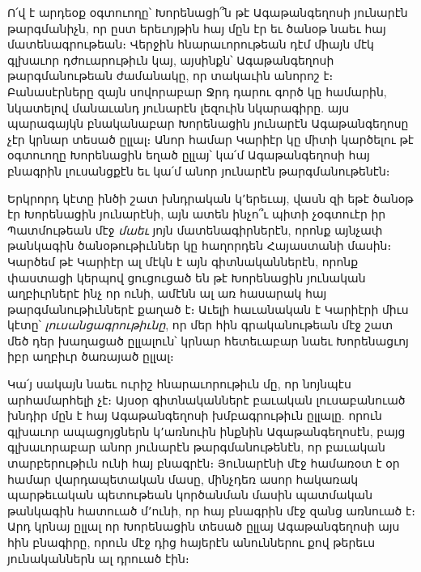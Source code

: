 \documentclass{article}
\begin{document}
{Ո՛վ է արդեօք օգտուողը՝ Խորենացի՞ն թէ Ագաթանգեղոսի յունարէն թարգմանիչն, որ ըստ երեւոյթին հայ մըն էր եւ ծանօթ նաեւ հայ մատենագրութեան։ Վերջին հնարաւորութեան դէմ միայն մէկ գլխաւոր դժուարութիւն կայ, այսինքն՝ Ագաթանգեղոսի թարգմանութեան ժամանակը, որ տակաւին անորոշ է։ Բանասէրները զայն սովորաբար Ջրդ դարու գործ կը համարին, նկատելով մանաւանդ յունարէն լեզուին նկարագիրը. այս պարագայկն բնականաբար Խորենացին յունարէն Ագաթանգեղոսը չէր կրնար տեսած ըլլալ։ Անոր համար Կարիէր կը միտի կարծելու թէ օգտուողը Խորենացին եղած ըլլայ՝ կա՛մ Ագաթանգեղոսի հայ բնագրին լուսանցքէն եւ կա՛մ անոր յունարէն թարգմանութենէն։

Երկրորդ կէտը ինծի շատ խնդրական կ՚երեւայ, վասն զի եթէ ծանօթ էր Խորենացին յունարէնի, այն ատեն ինչո՞ւ պիտի չօգտուէր իր Պատմութեան մէջ \emph{մաեւ} յոյն մատենագիրներէն, որոնք այնչափ թանկագին ծանօթութիւններ կը հաղորդեն Հայաստանի մասին։ Կարծեմ թէ Կարիէր ալ մէկն է այն գիտնականներէն, որոնք փաստացի կերպով ցուցուցած են թէ Խորենացին յունական աղբիւրներէ ինչ որ ունի, ամէնն ալ առ հասարակ հայ թարգմանութիւններէ քաղած է։ Աւելի հաւանական է Կարիէրի միւս կէտը՝ \emph{լուսանցագրութիւնը}, որ մեր հին գրականութեան մէջ շատ մեծ դեր խաղացած ըլլալուն՝ կրնար հետեւաբար նաեւ Խորենացւոյ իբր աղբիւր ծառայած ըլլալ։

Կա՛յ սակայն նաեւ ուրիշ հնարաւորութիւն մը, որ նոյնպէս արհամարհելի չէ։ Այսօր գիտնականներէ բաւական լուսաբանուած խնդիր մըն է հայ Ագաթանգեղոսի խմբագրութիւն ըլլալը. որուն գլխաւոր ապացոյցներն կ՚առնուին ինքնին Ագաթանգեղոսէն, բայց գլխաւորաբար անոր յունարէն թարգմանութենէն, որ բաւական տարբերութիւն ունի հայ բնագրէն։ Յունարէնի մէջ համառօտ է օր համար վարդապետական մասը, մինչդեռ ասոր հակառակ պարթեւական պետութեան կործանման մասին պատմական թանկագին հատուած մ՚ունի, որ հայ բնագրին մէջ զանց առնուած է։ Արդ կրնայ ըլլալ որ Խորենացին տեսած ըլլայ Ագաթանգեղոսի այս հին բնագիրը, որուն մէջ դից հայերէն անուններու քով թերեւս յունականներն ալ դրուած էին։

}
\end{document}
